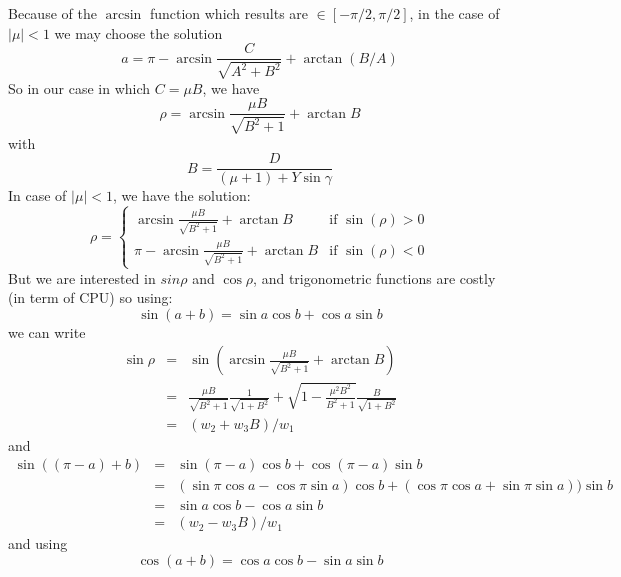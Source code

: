       Because of the $\arcsin$ function which results are $\in [-\pi/2, \pi/2]$, in the case of $|\mu|<1$ we may choose the solution
      \begin{equation}
        a = \pi - \arcsin \frac{C}{\sqrt{A^2 + B^2}} + \arctan(B/A) 
      \end{equation}
      So in our case in which $C=\mu B$, we have 
      \begin{equation}
        \rho = \arcsin \frac{\mu B}{\sqrt{B^2 + 1}} + \arctan B
      \end{equation}
      with
      \begin{equation}
        B = \frac{D}{(\mu + 1) + Y\sin\gamma}
      \end{equation}
      In case of $|\mu|<1$, we have the solution:
      \begin{equation}
        \rho =
	\begin{cases}
	  \arcsin \frac{\mu B}{\sqrt{B^2 + 1}} + \arctan B       &\text{if $\sin(\rho) > 0$} \\
	  \pi - \arcsin \frac{\mu B}{\sqrt{B^2 + 1}} + \arctan B &\text{if $\sin(\rho) < 0$}
        \end{cases}
      \end{equation}
      But we are interested in $sin\rho$ and $\cos\rho$,
      and trigonometric functions are costly (in term of CPU)  
      so using:
      \begin{equation}
        \sin(a+b) = \sin a\cos b + \cos a\sin b
      \end{equation}
      we can write
      \begin{eqnarray}
        \sin \rho & = & \sin\left(\arcsin \frac{\mu B}{\sqrt{B^2 + 1}} + \arctan B\right) \\
	          & = & \frac{\mu B}{\sqrt{B^2 + 1}}        \frac{1}{\sqrt{1 + B^2}}
		      + \sqrt{1 - \frac{\mu^2B^2}{B^2 + 1}} \frac{B}{\sqrt{1 + B^2}} \\
		  & = & (w_2 + w_3 B) / w_1
      \end{eqnarray}
      and
      \begin{eqnarray}
        \sin((\pi-a)+b) & = & \sin (\pi - a)\cos b + \cos(\pi - a)\sin b \\
	                & = & (\sin\pi\cos a - \cos\pi\sin a)\cos b + (\cos\pi\cos a + \sin\pi\sin a))\sin b \\
			& = & \sin a\cos b - \cos a\sin b \\
			& = & (w_2 - w_3B) / w_1
      \end{eqnarray}
      and using
      \begin{equation}
        \cos(a+b) = \cos a\cos b - \sin a\sin b
      \end{equation}
